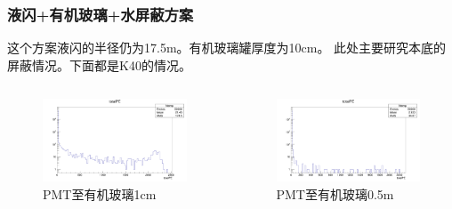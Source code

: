 \begin{frame}
    \frametitle{液闪+有机玻璃+水屏蔽方案}
    这个方案液闪的半径仍为17.5m。有机玻璃罐厚度为10cm。
    此处主要研究本底的屏蔽情况。下面都是K40的情况。
    \begin{columns}
        \column{6.5cm}
        \begin{figure}
            \includegraphics[width=6.5cm,keepaspectratio]{data/water_0.01m_K40_totalPE.png}
            \caption{PMT至有机玻璃1cm}
        \end{figure}
        \column{6.5cm}
        \begin{figure}
            \includegraphics[width=6.5cm,keepaspectratio]{data/water_0.5m_K40_totalPE.png}
            \caption{PMT至有机玻璃0.5m}
        \end{figure}
    \end{columns}
\end{frame}

